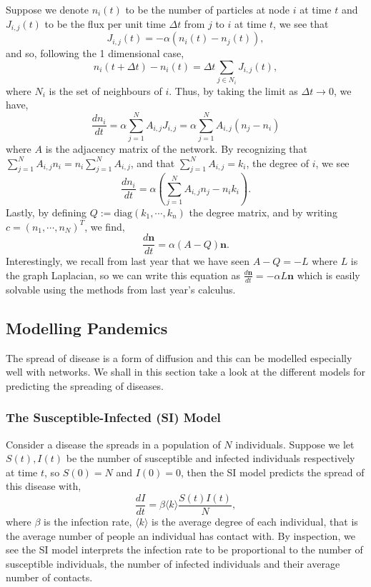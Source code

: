 \documentclass[
]{article}
\theoremstyle{definition}
\theoremstyle{definition}
\begin{document}
Suppose we denote \(n_i(t)\) to be the number of particles at node \(i\)
at time \(t\) and \(J_{i,j}(t)\) to be the flux per unit time
\(\Delta t\) from \(j\) to \(i\) at time \(t\), we see that
\[J_{i, j}(t) = -\alpha(n_i(t) - n_j(t)),\] and so, following the 1
dimensional case,
\[n_i(t + \Delta t) - n_i(t) = \Delta t \sum_{j \in N_i} J_{i, j}(t),\]
where \(N_i\) is the set of neighbours of \(i\). Thus, by taking the
limit as \(\Delta t \to 0\), we have, \begin{equation}
  \frac{dn_i}{dt} = \alpha \sum_{j = 1}^N A_{i, j} J_{i, j} = 
  \alpha \sum_{j = 1}^N A_{i, j}(n_j - n_i)
\end{equation} where \(A\) is the adjacency matrix of the network. By
recognizing that
\(\sum_{j = 1}^N A_{i, j}n_i = n_i \sum_{j = 1}^N A_{i, j}\), and that
\(\sum_{j = 1}^N A_{i, j} = k_i\), the degree of \(i\), we see
\begin{equation}
  \frac{dn_i}{dt} = \alpha (\sum_{j = 1}^N A_{i, j} n_j - n_i k_i).
\end{equation} Lastly, by defining
\(Q := \text{diag}(k_1, \cdots, k_n)\) the degree matrix, and by writing
\(c = (n_1, \cdots, n_N)^T\), we find, \begin{equation}
  \frac{d\mathbf{n}}{dt} = \alpha (A - Q)\mathbf{n}.
\end{equation} Interestingly, we recall from last year that we have seen
\(A - Q = -L\) where \(L\) is the graph Laplacian, so we can write this
equation as \(\frac{d\mathbf{n}}{dt} = -\alpha L \mathbf{n}\) which is
easily solvable using the methods from last year's calculus.

\hypertarget{modelling-pandemics}{%
\subsection{Modelling Pandemics}\label{modelling-pandemics}}

The spread of disease is a form of diffusion and this can be modelled
especially well with networks. We shall in this section take a look at
the different models for predicting the spreading of diseases.

\hypertarget{the-susceptible-infected-si-model}{%
\subsubsection{The Susceptible-Infected (SI)
Model}\label{the-susceptible-infected-si-model}}

Consider a disease the spreads in a population of \(N\) individuals.
Suppose we let \(S(t), I(t)\) be the number of susceptible and infected
individuals respectively at time \(t\), so \(S(0) = N\) and
\(I(0) = 0\), then the SI model predicts the spread of this disease
with, \[\frac{dI}{dt} = \beta \langle k \rangle \frac{S(t) I(t)}{N},\]
where \(\beta\) is the infection rate, \(\langle k \rangle\) is the
average degree of each individual, that is the average number of people
an individual has contact with. By inspection, we see the SI model
interprets the infection rate to be proportional to the number of
susceptible individuals, the number of infected individuals and their
average number of contacts.
\end{document}
